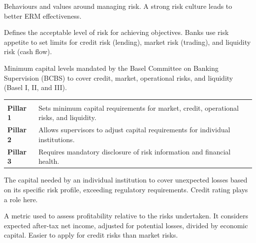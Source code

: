 
Behaviours and values around managing risk. A strong risk culture leads to better
ERM effectiveness.


Defines the acceptable level of risk for achieving objectives. Banks use risk
appetite to set limits for credit risk (lending), market risk (trading), and
liquidity risk (cash flow).




Minimum capital levels mandated by the Basel Committee on Banking Supervision
(BCBS) to cover credit, market, operational risks, and liquidity (Basel I, II,
and III).

\noindent\begin{minipage}{\textwidth}
\renewcommand{\arraystretch}{1.35}
\begin{tabularx}{\textwidth}{@{}L{0.14\textwidth}Y@{}}
  & \\
{\tabfont \textbf{Pillar 1}} & {\tabfont Sets minimum capital requirements for market, credit, operational risks, and liquidity.}\\
{\tabfont \textbf{Pillar 2}} & {\tabfont Allows supervisors to adjust capital requirements for individual institutions.}\\
{\tabfont \textbf{Pillar 3}} & {\tabfont Requires mandatory disclosure of risk information and financial health.}\\
\end{tabularx}
\end{minipage}


The capital needed by an individual institution to cover unexpected losses based
on its specific risk profile, exceeding regulatory requirements. Credit rating
plays a role here.


A metric used to assess profitability relative to the risks undertaken. It
considers expected after-tax net income, adjusted for potential losses, divided by
economic capital. Easier to apply for credit risks than market risks.

